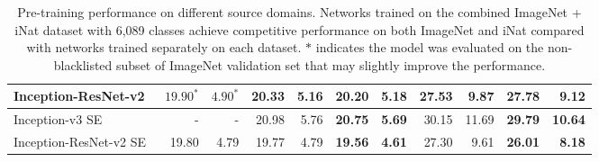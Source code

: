 \documentclass[10pt,twocolumn,letterpaper]{article}
\begin{document}
\begin{table*}[t]
\begin{center}
\begin{tabular}{ lcccccccccc }
\multicolumn{1}{l}{Inception-ResNet-v2~\cite{inception-v4}} & \multicolumn{1}{|r}{$19.90^*$} & \multicolumn{1}{|r}{$4.90^*$} & \multicolumn{1}{|r}{20.33} & \multicolumn{1}{|r}{\textbf{5.16}} & \multicolumn{1}{|r}{\textbf{20.20}} & \multicolumn{1}{|r}{5.18} & \multicolumn{1}{|r}{\textbf{27.53}} & \multicolumn{1}{|r}{9.87} & \multicolumn{1}{|r}{27.78} & \multicolumn{1}{|r}{\textbf{9.12}} \\ \hline \hline
\multicolumn{1}{l}{Inception-v3 SE~\cite{senet}} & \multicolumn{1}{|r}{-} & \multicolumn{1}{|r}{-}  & \multicolumn{1}{|r}{20.98} & \multicolumn{1}{|r}{5.76} & \multicolumn{1}{|r}{\textbf{20.75}} & \multicolumn{1}{|r}{\textbf{5.69}} & \multicolumn{1}{|r}{30.15} & \multicolumn{1}{|r}{11.69} & \multicolumn{1}{|r}{\textbf{29.79}} & \multicolumn{1}{|r}{\textbf{10.64}} \\
\multicolumn{1}{l}{Inception-ResNet-v2 SE~\cite{senet}} & \multicolumn{1}{|r}{19.80} & \multicolumn{1}{|r}{4.79} & \multicolumn{1}{|r}{19.77} & \multicolumn{1}{|r}{4.79} & \multicolumn{1}{|r}{\textbf{19.56}} & \multicolumn{1}{|r}{\textbf{4.61}} & \multicolumn{1}{|r}{27.30} & \multicolumn{1}{|r}{9.61} & \multicolumn{1}{|r}{\textbf{26.01}} & \multicolumn{1}{|r}{\textbf{8.18}} \\ \hline
\end{tabular}
\end{center}
\caption{Pre-training performance on different source domains. Networks trained on the combined ImageNet + iNat dataset with 6,089 classes achieve competitive performance on both ImageNet and iNat compared with networks trained separately on each dataset. $*$ indicates the model was evaluated on the non-blacklisted subset of ImageNet validation set that may slightly improve the performance.}
\label{tab:joint_training}
\end{table*}
\end{document}
